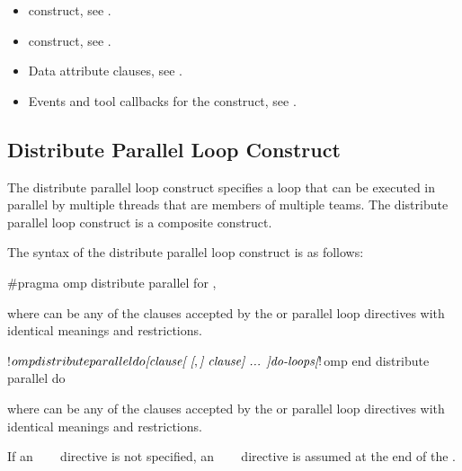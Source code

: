 \crossreferences
\begin{itemize}
\item {} construct, see
.

\item {} construct, see
.

\item Data attribute clauses, see
.

\item Events and tool callbacks for the  construct, see
.

\end{itemize}









\subsection{Distribute Parallel Loop Construct}
\label{subsec:Distribute Parallel Loop Construct}
\summary
The distribute parallel loop construct specifies a loop that can be executed in parallel by
multiple threads that are members of multiple teams. The distribute parallel loop construct is a composite construct.

\syntax
The syntax of the distribute parallel loop construct is as follows:

\begin{ccppspecific}
\begin{ompcPragma}
#pragma omp distribute parallel for \plc{[clause[ [},\plc{] clause] ... ] newline}
\end{ompcPragma}

where  can be any of the clauses accepted by the  or parallel loop
directives with identical meanings and restrictions.
\end{ccppspecific}

\begin{fortranspecific}
\begin{ompfPragma}
!$omp distribute parallel do \plc{[clause[ [},\plc{] clause] ... ]}
    \plc{do-loops}
\plc{[}!$omp end distribute parallel do\plc{]}
\end{ompfPragma}

where  can be any of the clauses accepted by the  or parallel loop
directives with identical meanings and restrictions.

If an ~~~ directive is not specified, an
~~~ directive is assumed at the end of the .
\end{fortranspecific}

